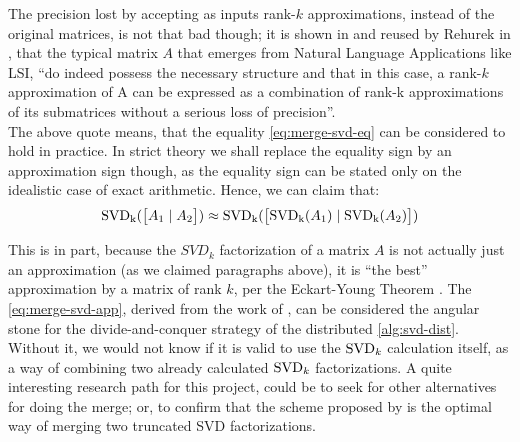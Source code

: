 The precision lost by accepting as inputs rank-$k$ approximations,
instead of the original matrices, is not that bad though; it is shown in
\cite{zha00} and reused by Rehurek in \cite{rehurek11a}, that the
typical matrix $A$ that emerges from Natural Language 
Applications like LSI, ``do indeed possess the necessary structure and
that in this case, a rank-$k$ approximation of A can be expressed as a
combination of rank-k approximations of its submatrices without a
serious loss of precision''. \\

The above quote means, that the equality \cref{eq:merge-svd-eq} can
be considered to hold in practice. In strict theory we shall replace the
equality sign by an approximation sign though, as the equality sign
can be stated only on the idealistic case of exact arithmetic. Hence,
we can claim that: \\

\begin{equation}
\label{eq:merge-svd-app}
\operatorname{SVD_k}(\begin{bmatrix}A_1 \mid A_2\end{bmatrix}) \approx
\operatorname{SVD_k}(\begin{bmatrix}\operatorname{SVD_k}(A_1) \mid \operatorname{SVD_k}(A_2)\end{bmatrix})
\end{equation}
\hfill

This is in part, because the $SVD_k$ factorization of a matrix $A$ is
not actually just an approximation (as we claimed paragraphs above),
it is  ``the best'' approximation by a matrix of rank $k$, per the
Eckart-Young Theorem \cite{eckart36}. The \cref{eq:merge-svd-app},
derived from the work of \cite{zha00}, can be considered the angular
stone for the divide-and-conquer strategy of
the distributed \cref{alg:svd-dist}. Without it, we would not know if
it is valid to use the $\operatorname{SVD}_k$ calculation itself, as a way of
combining two already calculated $\operatorname{SVD}_k$ factorizations. A quite
interesting research path for this project, could be to seek for other
alternatives for doing the merge; or, to confirm that the scheme
proposed by \Rehurek is the optimal way of merging two truncated SVD
factorizations. 


